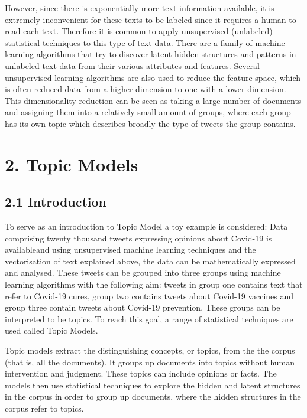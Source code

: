 \documentclass[
]{article}
\begin{document}
However, since there is exponentially more text information available,
it is extremely inconvenient for these texts to be labeled since it
requires a human to read each text. Therefore it is common to apply
unsupervised (unlabeled) statistical techniques to this type of text
data. There are a family of machine learning algorithms that try to
discover latent hidden structures and patterns in unlabeled text data
from their various attributes and features. Several unsupervised
learning algorithms are also used to reduce the feature space, which is
often reduced data from a higher dimension to one with a lower
dimension. This dimensionality reduction can be seen as taking a large
number of documents and assigning them into a relatively small amount of
groups, where each group has its own topic which describes broadly the
type of tweets the group contains.

\hypertarget{topic-models}{%
\section{2. Topic Models}\label{topic-models}}

\hypertarget{introduction}{%
\subsection{2.1 Introduction}\label{introduction}}

To serve as an introduction to Topic Model a toy example is considered:
Data comprising twenty thousand tweets expressing opinions about
Covid-19 is availableand using unsupervised machine learning techniques
and the vectorisation of text explained above, the data can be
mathematically expressed and analysed. These tweets can be grouped into
three groups using machine learning algorithms with the following aim:
tweets in group one contains text that refer to Covid-19 cures, group
two contains tweets about Covid-19 vaccines and group three contain
tweets about Covid-19 prevention. These groups can be interpreted to be
topics. To reach this goal, a range of statistical techniques are used
called Topic Models.

Topic models extract the distinguishing concepts, or topics, from the
the corpus (that is, all the documents). It groups up documents into
topics without human intervention and judgment. These topics can include
opinions or facts. The models then use statistical techniques to explore
the hidden and latent structures in the corpus in order to group up
documents, where the hidden structures in the corpus refer to topics.
\end{document}
